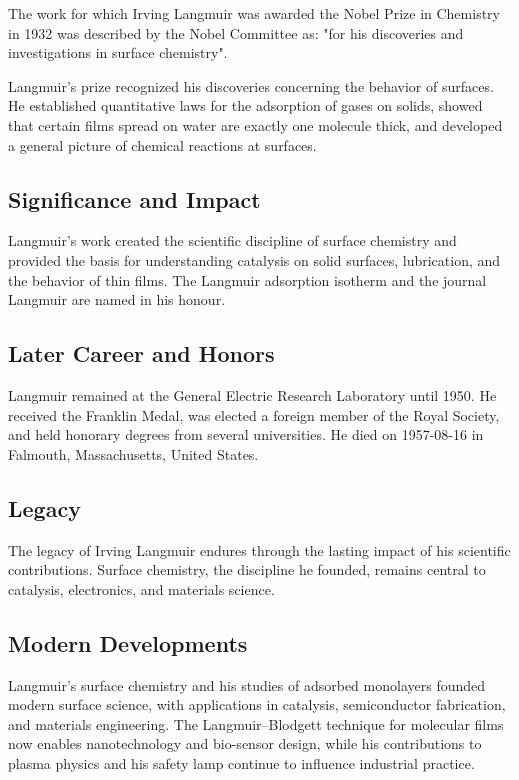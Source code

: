 The work for which Irving Langmuir was awarded the Nobel Prize in Chemistry in 1932 was described by the Nobel Committee as: "for his discoveries and investigations in surface chemistry".

Langmuir's prize recognized his discoveries concerning the behavior of surfaces.
He established quantitative laws for the adsorption of gases on solids, showed that certain films spread on water are exactly one molecule thick, and developed a general picture of chemical reactions at surfaces.

\subsection*{Significance and Impact}

Langmuir's work created the scientific discipline of surface chemistry and provided the basis for understanding catalysis on solid surfaces, lubrication, and the behavior of thin films.
The Langmuir adsorption isotherm and the journal Langmuir are named in his honour.

\subsection*{Later Career and Honors}

Langmuir remained at the General Electric Research Laboratory until 1950.
He received the Franklin Medal, was elected a foreign member of the Royal Society, and held honorary degrees from several universities.
He died on 1957-08-16 in Falmouth, Massachusetts, United States.

\subsection*{Legacy}

The legacy of Irving Langmuir endures through the lasting impact of his scientific contributions.
Surface chemistry, the discipline he founded, remains central to catalysis, electronics, and materials science.

\subsection*{Modern Developments}

Langmuir's surface chemistry and his studies of adsorbed monolayers founded modern surface science, with applications in catalysis, semiconductor fabrication, and materials engineering. The Langmuir–Blodgett technique for molecular films now enables nanotechnology and bio-sensor design, while his contributions to plasma physics and his safety lamp continue to influence industrial practice.

